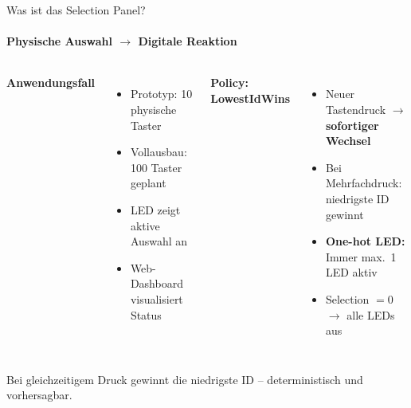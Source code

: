 \begin{frame}{Was ist das Selection Panel?}
\framesubtitle{Physische Auswahl $\rightarrow$ Digitale Reaktion}

\begin{columns}[T,onlytextwidth]
\textbf{Anwendungsfall}
\begin{itemize}
  \item Prototyp: 10 physische Taster
  \item Vollausbau: 100 Taster geplant
  \item LED zeigt aktive Auswahl an
  \item Web-Dashboard visualisiert Status
\end{itemize}

\textbf{Policy: \glqq{}LowestIdWins\grqq{}}
\begin{itemize}
  \item Neuer Tastendruck $\rightarrow$ \textbf{sofortiger Wechsel}
  \item Bei Mehrfachdruck: niedrigste ID gewinnt
  \item \textbf{One-hot LED:} Immer max.\ 1 LED aktiv
  \item Selection $=0$ $\rightarrow$ alle LEDs aus
\end{itemize}
\end{columns}

\vspace{0.3cm}
 Bei gleichzeitigem Druck gewinnt die niedrigste ID -- deterministisch und vorhersagbar.
\end{frame}

